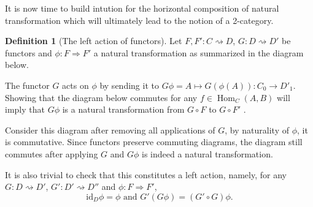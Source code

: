 \documentclass{article}
\newtheorem{prop}[thm]{Proposition}
\theoremstyle{definition}
\newtheorem{defn}[thm]{Definition}
\theoremstyle{remark}
\DeclareMathOperator{\Hom}{Hom}
\newcommand{\id}{\text{id}}
\begin{document}
%	

It is now time to build intution for the horizontal composition of natural transformation which will ultimately lead to the notion of a 2-category.
\begin{defn}[The left action of functors]
	Let $F,F':C\rightsquigarrow D$, $G:D\rightsquigarrow D'$ be functors and $\phi:F\Rightarrow F'$ a natural transformation as summarized in the diagram below.
	\begin{figure}[h]
		\centering
	\end{figure}
	
	The functor $G$ acts on $\phi$ by sending it to $G\phi = A \mapsto G(\phi(A)) : C_0 \rightarrow D'_1$. Showing that the diagram below commutes for any $f \in \Hom_C(A,B)$ will imply that $G\phi$ is a natural transformation from $G\circ F$ to $G\circ F'$ .
	\begin{figure}[H]
		\centering
	\end{figure}
	
	Consider this diagram after removing all applications of $G$, by naturality of $\phi$, it is commutative. Since functors preserve commuting diagrams, the diagram still commutes after applying $G$ and $G\phi$ is indeed a natural transformation.
	
	It is also trivial to check that this constitutes a left action, namely, for any $G:D\rightsquigarrow D'$, $G':D' \rightsquigarrow D''$ and $\phi:F\Rightarrow F'$, \[\id_D\phi = \phi \text{ and } G'(G\phi)= (G' \circ G)\phi.\]
\end{defn}
\end{document}
